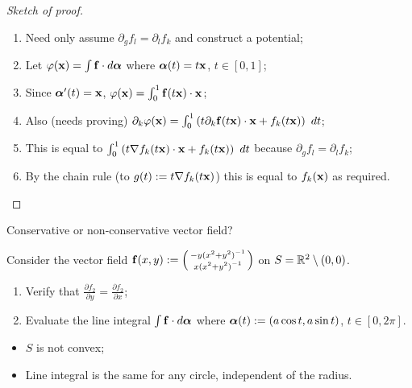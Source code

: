 \begin{proof}[Sketch of proof]
    \begin{enumerate}
        \item Need only assume \(\partial_g f_l = \partial_l f_k\) and construct a potential;
        \item Let \(\varphi(\mathbf{x}) = \int \mathbf{f} \cdot d\boldsymbol{\alpha}\) where \(\boldsymbol{\alpha}(t) = t\mathbf{x}\), \(t\in[0,1]\);
        \item Since \(\boldsymbol{\alpha}'(t) = \mathbf{x}\), \(\varphi(\mathbf{x}) = \int_0^1 \mathbf{f}(t\mathbf{x})\cdot \mathbf{x}\);
        \item Also (needs proving) \(\partial_k  \varphi(\xx) = \int_{0}^{1} \left( t \partial_k \ff(t\xx) \cdot \xx + f_k(t\xx) \right) \ dt\);
        \item This is equal to \(\int_{0}^{1} \left( t \nabla f_k(t\mathbf{x}) \cdot \mathbf{x} + f_k(t\mathbf{x}) \right) \ dt\) because  \(\partial_g f_l = \partial_l f_k\);
        \item By the chain rule (to \(g(t):= t \nabla f_k(t\mathbf{x}) \)) this is equal to \(f_k(\mathbf{x})\) as required.
    \end{enumerate}

\end{proof}




{Conservative or non-conservative vector field?}


\begin{example}
    Consider the vector field \(\mathbf{f}(x,y) := \left(\begin{smallmatrix}
        -y {(x^2 + y^2)}^{-1} \\ x {(x^2 + y^2)}^{-1}
    \end{smallmatrix}\right)\)
    on \(S = \mathbb{R}^2 \setminus (0,0)\).
    \begin{enumerate}
        \item Verify that \(  \tfrac{\partial f_2}{\partial y} = \tfrac{\partial f_2}{\partial x}\);
        \item Evaluate the line integral \(\int \mathbf{f} \cdot d\boldsymbol{\alpha}\) where \(\boldsymbol{\alpha}(t) := (a \cos t, a \sin t)\), \(t\in [0,2\pi]\).
    \end{enumerate}

\end{example}


\begin{itemize}
    \item \(S\) is not convex;
    \item Line integral is the same for any circle, independent of the radius.
\end{itemize}


